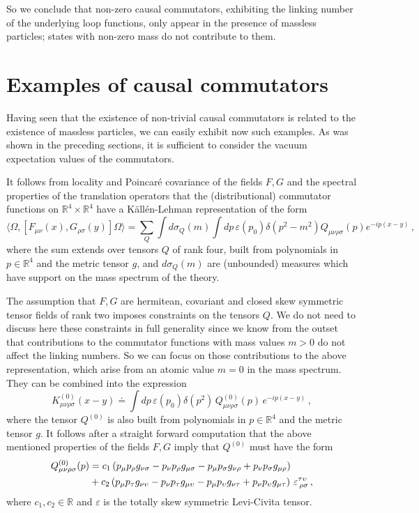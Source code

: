 \documentclass[11pt]{article}
\numberwithin{equation}{section}
\newcommand{\RR}{{\mathbb R}}
\begin{document}
So we conclude that non-zero causal commutators, exhibiting the
linking number of the underlying loop functions, only appear
in the presence of massless particles; states with non-zero mass do not 
contribute to them.  

\section{Examples of causal commutators }
\label{sec5}

Having seen that the existence of non-trivial causal commutators 
is related to the existence of massless particles, 
we can easily exhibit now such examples. As was shown in the preceding
sections, it is sufficient to consider the vacuum expectation 
values of the commutators.

\medskip 
It follows from locality and Poincar\'e covariance 
of the fields  $F,G$ and 
the spectral properties of the translation 
operators that the (distributional)  
commutator functions on $\RR^4 \times \RR^4$ have a 
K\"all\'en-Lehman representation of the form 
$$
\langle \Omega, [F_{\mu \nu}(x), G_{\rho \sigma}(y) ] \Omega \rangle = \sum_Q
\!  \!
\int \! d \sigma_Q(m) \!  \! 
\int \! dp \, \varepsilon(p_0) \delta(p^2 - m^2) 
Q_{\mu \nu \rho \sigma}(p) e^{-ip(x-y)} \, ,
$$
where the sum extends over tensors $Q$ of rank four,   
built from polynomials in $p \in \RR^4$ and the metric 
tensor $g$, and $d \sigma_Q(m)$ are (unbounded)  
measures which have support on the mass
spectrum of the theory. 

\medskip 
The assumption that $F,G$ are hermitean, covariant and closed skew symmetric  
tensor fields of rank two imposes constraints on the tensors $Q$. 
We do not need to discuss here these constraints in full
generality since we know from the outset that contributions to the 
commutator functions with mass values $m>0$ 
do not affect the linking numbers. So we can focus on those
contributions to the above representation, which arise from an 
atomic value $m=0$ in the mass spectrum. They can be combined into
the expression
\begin{equation}
\label{e.5.1}
K^{(0)}_{\mu \nu \rho \sigma}(x-y) \doteq 
\int \! dp \, \varepsilon(p_0) \delta(p^2) 
\, Q^{(0)}_{\mu \nu \rho \sigma}(p) \, e^{-ip(x-y)} \, , 
\end{equation} 
where the tensor $ Q^{(0)}$ is also built from  
polynomials in $p \in \RR^4$ and the metric 
tensor $g$. It follows after a straight forward
computation that the above mentioned properties of the fields $F,G$ 
imply that $Q^{(0)}$ must have the form
\begin{align}
\label{e.5.2}
Q^{(0)}_{\mu \nu \rho \sigma}(p) & =
c_1 \, (p_\mu p_\rho g_{\nu \sigma}  - p_\nu p_\rho g_{\mu \sigma}
- p_\mu p_\sigma g_{\nu \rho} + p_\nu p_\sigma g_{\mu \rho}) \notag\\
& + c_2 \, (p_\mu p_\tau g_{\nu \upsilon}  - p_\nu p_\tau g_{\mu \upsilon}
- p_\mu p_\upsilon g_{\nu \tau} + p_\nu p_\upsilon g_{\mu \tau}) \ 
\varepsilon^{\tau \upsilon}_{\, \rho \sigma} \, , 
\end{align}
where $c_1, c_2 \in \RR$ and $\varepsilon$ is the 
totally skew symmetric Levi-Civita tensor. 
\end{document}
